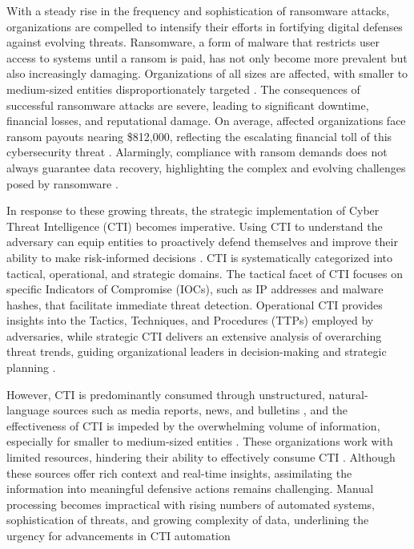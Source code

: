 \documentclass[running heads]{llncs}
\begin{document}
With a steady rise in the frequency and sophistication of ransomware attacks, organizations are compelled to intensify their efforts in fortifying digital defenses against evolving threats. Ransomware, a form of malware that restricts user access to systems until a ransom is paid, has not only become more prevalent but also increasingly damaging. Organizations of all sizes are affected, with smaller to medium-sized entities disproportionately targeted \cite{Beaman:2021, Richardson_undated-vx}. The consequences of successful ransomware attacks are severe, leading to significant downtime, financial losses, and reputational damage. On average, affected organizations face ransom payouts nearing \$812,000, reflecting the escalating financial toll of this cybersecurity threat \cite{Beaman:2021, Sophos:2022}. Alarmingly, compliance with ransom demands does not always guarantee data recovery, highlighting the complex and evolving challenges posed by ransomware \cite{Sherborne_undated-ls}.

In response to these growing threats, the strategic implementation of Cyber Threat Intelligence (CTI) becomes imperative. Using CTI to understand the adversary can equip entities to proactively defend themselves and improve their ability to make risk-informed decisions \cite{Wagner:2019}. CTI is systematically categorized into tactical, operational, and strategic domains. The tactical facet of CTI focuses on specific Indicators of Compromise (IOCs), such as IP addresses and malware hashes, that facilitate immediate threat detection. Operational CTI provides insights into the Tactics, Techniques, and Procedures (TTPs) employed by adversaries, while strategic CTI delivers an extensive analysis of overarching threat trends, guiding organizational leaders in decision-making and strategic planning \cite{Ettinger2019}.

However, CTI is predominantly consumed through unstructured, natural-language sources such as media reports, news, and bulletins \cite{SANS:2022}, and the effectiveness of CTI is impeded by the overwhelming volume of information, especially for smaller to medium-sized entities \cite{McHugh:2021}. These organizations work with limited resources, hindering their ability to effectively consume CTI \cite{Wagner:2019}. Although these sources offer rich context and real-time insights, assimilating the information into meaningful defensive actions remains challenging. Manual processing becomes impractical with rising numbers of automated systems, sophistication of threats, and growing complexity of data, underlining the urgency for advancements in CTI automation
\end{document}
